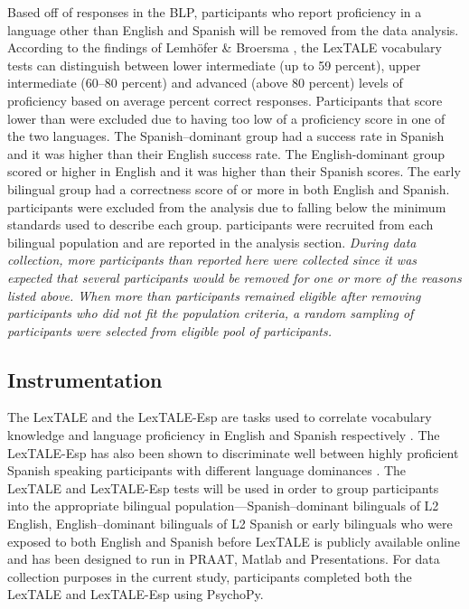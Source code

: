 Based off of responses in the BLP, participants who report proficiency in a language other than English and Spanish will be removed from the data analysis. According to the findings of Lemhöfer \& Broersma \parencite*{Lemhofer2012-hz}, the LexTALE vocabulary tests can distinguish between lower intermediate (up to 59 percent), upper intermediate (60–80 percent) and advanced (above 80 percent) levels of proficiency based on average percent correct responses. Participants that score lower than %
were excluded due to having too low of a proficiency score in one of the two languages. The Spanish–dominant group had a %
success rate in Spanish and it was higher than their English success rate. The English-dominant group scored %
or higher in English and it was higher than their Spanish scores. The early bilingual group had a correctness score of %
or more in both English and Spanish. %
participants were excluded from the analysis due to falling below the minimum standards used to describe each group. %
participants were recruited from each bilingual population and are reported in the analysis section. 
\emph{During data collection, more participants than reported here were collected since it was expected that several participants would be removed for one or more of the reasons listed above. When more than %
participants remained eligible after removing participants who did not fit the population criteria, a random sampling of %
participants were selected from eligible pool of participants.}


\subsection{Instrumentation}
The LexTALE and the LexTALE-Esp are tasks used to correlate vocabulary knowledge and language proficiency in English and Spanish respectively \citep{Izura2014-yw,Lemhofer2012-hz}. The LexTALE-Esp has also been shown to discriminate well between highly proficient Spanish speaking participants with different language dominances \citep{Ferre2017-jq}. The LexTALE and LexTALE-Esp tests will be used in order to group participants into the appropriate bilingual population—Spanish–dominant bilinguals of L2 English, English–dominant bilinguals of L2 Spanish or early bilinguals who were exposed to both English and Spanish before %
LexTALE is publicly available online and has been designed to run in PRAAT, Matlab and Presentations. For data collection purposes in the current study, participants completed both the LexTALE and LexTALE-Esp using PsychoPy. 

